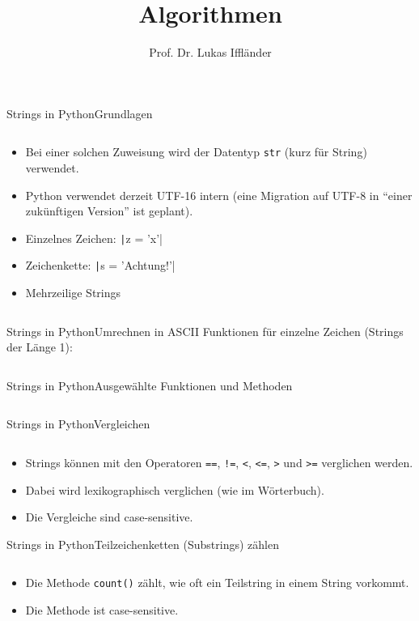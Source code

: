 \documentclass[xelatex,aspectratio=169]{beamer}
\title{Algorithmen}
\author{Prof. Dr. Lukas Iffländer}
\institute{HTW Dresden}
\date{}
\begin{document}
\begin{frame}{Strings in Python}{Grundlagen}
    \inputminted{python}{src/strings_hello.py}
    \begin{itemize}
        \item Bei einer solchen Zuweisung wird der Datentyp \texttt{str} (kurz für String) verwendet.
        \item Python verwendet derzeit UTF-16 intern (eine Migration auf UTF-8 in \enquote{einer zukünftigen Version} ist geplant).
        \item Einzelnes Zeichen: \texttt|z = 'x'|
        \item Zeichenkette: \texttt|s = 'Achtung!'|
        \item Mehrzeilige Strings
              \inputminted{python}{src/strings_multiline.py}
    \end{itemize}
\end{frame}

\begin{frame}{Strings in Python}{Umrechnen in ASCII}
    Funktionen für einzelne Zeichen (Strings der Länge 1):
    \inputminted{python}{src/strings_conversion.py}

\end{frame}

\begin{frame}{Strings in Python}{Ausgewählte Funktionen und Methoden}
    \inputminted{python}{src/strings_functions.py}
\end{frame}

\begin{frame}{Strings in Python}{Vergleichen}
    \inputminted{python}{src/strings_comparison.py}
    \begin{itemize}
        \item Strings können mit den Operatoren \texttt{==}, \texttt{!=}, \texttt{<}, \texttt{<=}, \texttt{>} und \texttt{>=} verglichen werden.
        \item Dabei wird lexikographisch verglichen (wie im Wörterbuch).
        \item Die Vergleiche sind case-sensitive.
    \end{itemize}
\end{frame}

\begin{frame}{Strings in Python}{Teilzeichenketten (Substrings) zählen}
    \inputminted{python}{src/strings_substring_count.py}
    \begin{itemize}
        \item Die Methode \texttt{count()} zählt, wie oft ein Teilstring in einem String vorkommt.
        \item Die Methode ist case-sensitive.
    \end{itemize}
\end{frame}
\end{document}
